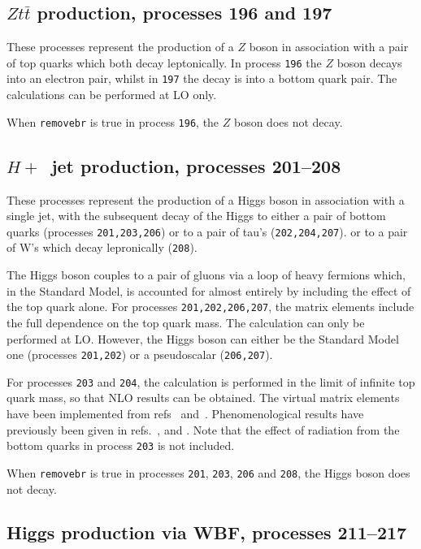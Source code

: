 \documentclass[12pt]{article}
\begin{document}
\subsection{$Zt{\bar t}$ production, processes 196 and 197}
\label{subsec:ztt}

These processes represent the production of a $Z$ boson in association
with a pair of top quarks which both decay leptonically.
In process {\tt 196} the $Z$ boson decays into an electron pair, whilst
in {\tt 197} the decay is into a bottom quark pair.
The calculations can be performed at LO only.

When {\tt removebr} is true in process {\tt 196}, the $Z$ boson does not decay.

\subsection{$H+$~jet production, processes 201--208}
\label{subsec:hjet}

These processes represent the production of a Higgs boson in association
with a single jet, with the subsequent decay of the Higgs to either
a pair of bottom quarks (processes {\tt 201,203,206}) 
or to a pair of tau's ({\tt 202,204,207}).
or to a pair of W's which decay lepronically ({\tt 208}).

The Higgs boson couples to a pair of gluons via a loop of heavy fermions
which, in the Standard Model, is accounted for almost entirely by including
the effect of the top quark alone. For processes {\tt 201,202,206,207}, the
matrix elements include the full dependence on the top quark mass.
The calculation can only be performed at LO. 
However, the Higgs boson can either be the Standard Model one
(processes {\tt 201,202}) or a pseudoscalar ({\tt 206,207}).

For processes {\tt 203} and {\tt 204}, the calculation is performed in the
limit of infinite top quark mass, so that NLO results can be obtained.
The virtual matrix elements have been implemented from
refs~\cite{Ravindran:2002dc} and~\cite{Schmidt:1997wr}.
Phenomenological results have previously been 
given in refs.~\cite{deFlorian:1999zd},\cite{Ravindran:2002dc} 
and \cite{Glosser:2002gm}.
Note that the effect of radiation from the bottom quarks in process {\tt 203}
is not included.

When {\tt removebr} is true in processes {\tt 201}, {\tt 203}, {\tt 206}
and {\tt 208}, the Higgs boson does not decay.

\subsection{Higgs production via WBF, processes 211--217}
\label{subsec:wbf}
\end{document}

